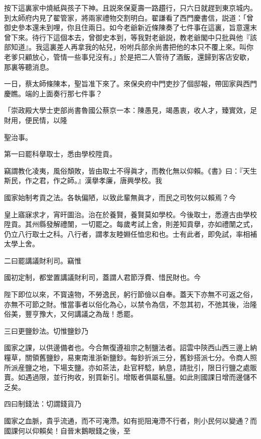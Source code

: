 按下這裏家中燒紙與孩子下神。且説來保夏壽一路趲行，只六日就趕到東京城内。到太師府内見了翟管家，將兩家禮物交割明白。翟謙看了西門慶書信，説道：「曾御史參本還未到哩，你且住兩日。如今老爺新近條陳奏了七件事在這裏，旨意還末曾下來。待行下這個本去，曾御史本到，等我對老爺説，教老爺閣中只批與他『該部知道』。我這裏差人再拿我的帖兒，吩咐兵部余尚書把他的本只不覆上來。叫你老爹只顧放心，管情一些事兒沒有。」於是把二人管待了酒飯，還歸到客店安歇，那裏等聽消息。

一日，蔡太師條陳本，聖旨准下來了。來保央府中門吏抄了個邸報，帶囬家與西門慶瞧。端的上面奏行那七件事？

\begin{myquote}[\markfont]
「崇政殿大學士吏部尚書魯國公蔡京一本：陳愚見，竭愚衷，收人才，臻實效，足財用，便民情，以隆

聖治事。

\hspace*{2em}第一曰罷科擧取士，悉由學校陞貢。

竊謂教化凌夷，風俗頽敗，皆由取士不得眞才，而教化無以仰賴。《書》曰：『天生斯民，作之君，作之師。』漢擧孝廉，唐興學校。我

國家始制考貢之法。各執偏陋，以致此輩無眞才，而民之司牧何以賴焉？今

皇上寤寐求才，宵旰圖治。治在於養賢，養賢莫如學校。今後取士，悉遵古由學校陞貢。其州縣發解禮闈，一切罷之。每歲考試上舍，則差知貢擧，亦如禮闈之式，仍立八行取士之科。八行者，謂孝友睦婣任恤忠和也。士有此者，即免試，率相補太學上舍。

\hspace*{2em}二曰罷講議財利司。竊惟

國初定制，都堂置講議財利司，蓋謂人君節浮費、惜民財也。今

陛下即位以來，不寳遠物，不勞逸民，躬行節儉以自奉。蓋天下亦無不可返之俗，亦無不可節之財。惟當事者以俗化為心，以禁令為信，不忽其初，不弛其後，治隆俗美，豐亨豫大，又何講議之為哉！悉罷。

\hspace*{2em}三曰更鹽鈔法。切惟鹽鈔乃

國家之課，以供邊備者也。今合無復遵祖宗之制鹽法者。詔雲中陝西山西三邊上納糧草，關領舊鹽鈔，易東南淮浙新鹽鈔。每鈔折派三分，舊鈔搭派七分。令商人照所派産鹽之地，下場支鹽。亦如茶法，赴官秤騐，納息，請批引，限日行鹽之處販賣。如遇過限，並行拘收，别買新引。增販者俱屬私鹽。如此則國課日增而邊儲不乏矣。

\hspace*{2em}四曰制錢法：切謂錢貨乃

國家之血脈，貴乎流通，而不可淹滯。如有扼阻淹滯不行者，則小民何以變通？而國課何以仰賴矣！自晉末鵝眼錢之後，至


\end{myquote}
